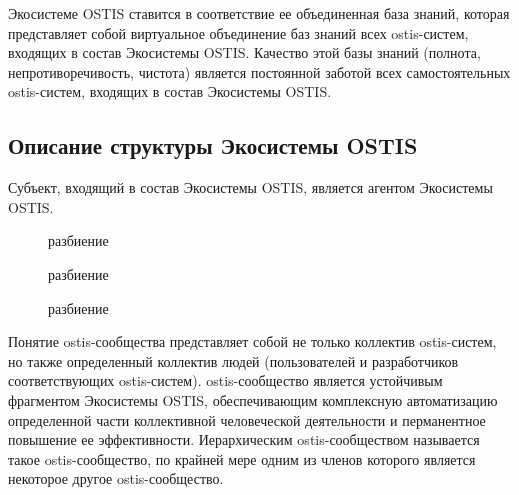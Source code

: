 Экосистеме OSTIS ставится в соответствие ее объединенная база знаний, которая представляет собой виртуальное объединение баз знаний всех ostis-систем, входящих в состав Экосистемы OSTIS.
Качество этой базы знаний (полнота, непротиворечивость, чистота) является постоянной заботой всех самостоятельных ostis-систем, входящих в состав Экосистемы OSTIS.


\subsection{Описание структуры Экосистемы OSTIS}
{\label{sec_ecosystem_structure_description}} 

Субъект, входящий в состав Экосистемы OSTIS, является агентом Экосистемы OSTIS.

\begin{figure}[htbp]
\begin{SCn}
\begin{scnrelfromset}{разбиение}
	\begin{scnindent}
    \begin{scnrelfromset}{разбиение}
    \end{scnrelfromset}
	\end{scnindent}
	\begin{scnindent}
    \begin{scnrelfromset}{разбиение}
    \end{scnrelfromset}
	\end{scnindent}
\end{scnrelfromset}
\end{SCn}
\end{figure}

Понятие ostis-сообщества представляет собой не только коллектив ostis-систем, но также определенный коллектив людей (пользователей и разработчиков соответствующих ostis-систем). 
ostis-сообщество является устойчивым фрагментом Экосистемы OSTIS, обеспечивающим комплексную автоматизацию определенной части коллективной человеческой деятельности и перманентное повышение ее эффективности. 
Иерархическим ostis-сообществом называется такое ostis-сообщество, по крайней мере одним из членов которого является некоторое другое ostis-сообщество.

